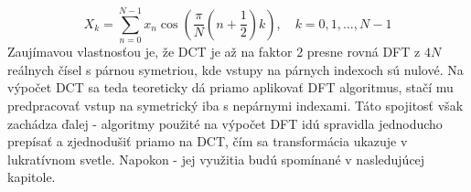 \begin{equation}
    X_k = \sum_{n=0}^{N-1} x_n \cos (\frac{\pi}{N} (n + \frac{1}{2}) k),
    \quad k=0,1,\dots,N-1
    \label{eq:dct_transform}
\end{equation}
Zaujímavou vlastnosťou je, že DCT je až na faktor 2 presne rovná DFT z
$4N$ reálnych čísel s párnou symetriou, kde vstupy na párnych indexoch
sú nulové. Na výpočet DCT sa teda teoreticky dá priamo aplikovať DFT
algoritmus, stačí mu predpracovať vstup na symetrický iba s nepárnymi
indexami. Táto spojitosť však zachádza ďalej - algoritmy použité na
výpočet DFT idú spravidla jednoducho prepísať a zjednodušiť priamo na
DCT, čím sa transformácia ukazuje v lukratívnom svetle. Napokon - jej
využitia budú spomínané v nasledujúcej kapitole.

